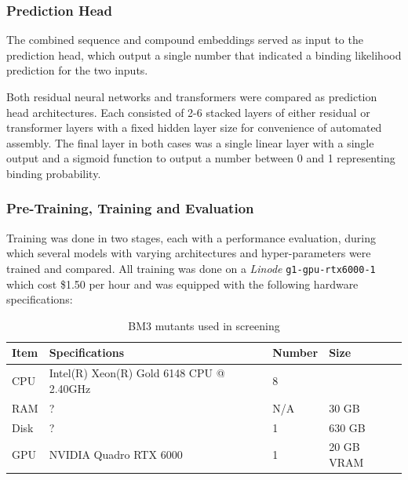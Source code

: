 \documentclass{article}
\begin{document}
\subsubsection{Prediction Head}

The combined sequence and compound embeddings served as input to the prediction head, which output a single number that indicated a binding likelihood prediction for the two inputs.

Both residual neural networks and transformers were compared as prediction head architectures.
Each consisted of 2-6 stacked layers of either residual or transformer layers with a fixed hidden layer size for convenience of automated assembly.
The final layer in both cases was a single linear layer with a single output and a sigmoid function to output a number between 0 and 1 representing binding probability.

\subsubsection{Pre-Training, Training and Evaluation}

Training was done in two stages, each with a performance evaluation, during which several models with varying architectures and hyper-parameters were trained and compared.
All training was done on a \textit{Linode} \texttt{g1-gpu-rtx6000-1} which cost \$1.50 per hour and was equipped with the following hardware specifications:

\begin{table}
	\begin{center}
		\caption{BM3 mutants used in screening\label{bm3_table}}
		\begin{tabular}{l|p{3cm}|l|l}
			\textbf{Item} & \textbf{Specifications} & \textbf{Number}  & \textbf{Size}\\
		\hline 
		CPU  & Intel(R) Xeon(R) Gold 6148 CPU @ 2.40GHz & 8 \\
		RAM  & ?  & N/A & 30 GB \\
		Disk & ?  & 1   & 630 GB \\
		GPU  & NVIDIA Quadro RTX 6000 & 1 & 20 GB VRAM \\ 

	\end{tabular}
	\end{center}
\end{table}
\end{document}
